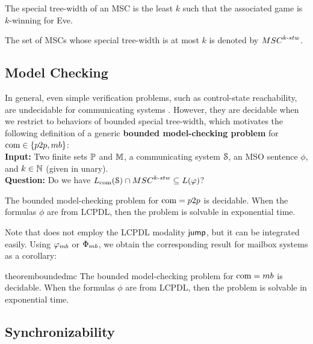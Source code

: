 \documentclass[a4paper,UKenglish,cleveref, autoref, thm-restate]{lipics-v2021}
\begin{document}
\begin{fact}
	The special tree-width of an MSC is the least $k$ such that
	the associated game is $k$-winning for Eve.
\end{fact}

The set of MSCs whose special tree-width is at most $k$ is denoted by $\stwMSCs{k}$.


\subsection{Model Checking}

In general, even simple verification problems, such
as control-state reachability, are undecidable for
communicating systems \cite{DBLP:journals/jacm/BrandZ83}.
However, they are decidable when we restrict to behaviors of
bounded special tree-width, which motivates the following
definition of a generic {\bf bounded model-checking problem} for $\comsymb \in \{\ppsymb, \mbsymb\}$:\\
%
{\bf Input:} Two finite sets $\mathbb{P}$ and $\mathbb{M}$, a communicating system $\mathcal{S}$, an MSO sentence $\phi$, and $k \in \mathbb{N}$ (given in unary).\\
%
{\bf Question:} Do we have $\cL{\Sys} \cap \stwMSCs{k} \subseteq L(\phi)$?


\begin{fact}\label{p2p}
The bounded model-checking problem for $\comsymb = \ppsymb$ is decidable.
When the formulas $\phi$ are from LCPDL, then the problem is solvable
in exponential time.
\end{fact}

Note that \cite{DBLP:journals/corr/abs-1904-06942} does not employ
the LCPDL modality $\textsf{jump}$, but it can be integrated easily.
Using $\mbformula$ or $\mbFormula$, we obtain the corresponding result
for mailbox systems as a corollary:

\begin{restatable}{theorem}{boundedmc}
\label{mailbox}
The bounded model-checking problem for $\comsymb =  \mbsymb$ is decidable.
When the formulas $\phi$ are from LCPDL, then the problem is solvable
in exponential time.
\end{restatable}



\subsection{Synchronizability}
\end{document}
